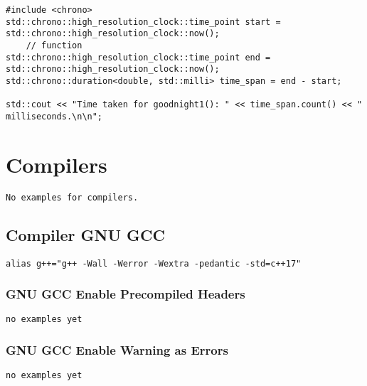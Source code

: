 \begin{verbatim}
#include <chrono>
std::chrono::high_resolution_clock::time_point start = std::chrono::high_resolution_clock::now();
    // function
std::chrono::high_resolution_clock::time_point end = std::chrono::high_resolution_clock::now();
std::chrono::duration<double, std::milli> time_span = end - start;

std::cout << "Time taken for goodnight1(): " << time_span.count() << " milliseconds.\n\n";
\end{verbatim}

\chapter{Compilers}
\begin{verbatim}
No examples for compilers.
\end{verbatim}

\section{Compiler GNU GCC}

\begin{verbatim}
alias g++="g++ -Wall -Werror -Wextra -pedantic -std=c++17"
\end{verbatim}

\subsection{GNU GCC Enable Precompiled Headers}

\begin{verbatim}
no examples yet
\end{verbatim}

\subsection{GNU GCC Enable Warning as Errors}

\begin{verbatim}
no examples yet
\end{verbatim}

